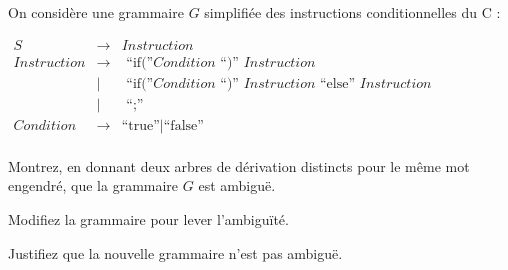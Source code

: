 
\begingroup

\begin{exercice}\label{exo:parsing/grammars/challenge}

  On considère une grammaire $G$ simplifiée des instructions conditionnelles du C :

  $\begin{array}{rrl}
    \mathit{S} &\rightarrow& \mathit{Instruction} \\
    \mathit{Instruction} & \rightarrow & \text{ ``if(''} \mathit{Condition} \text{ ``)'' } \mathit{Instruction}\\
    &\mid& \text{ ``if(''} \mathit{Condition} \text{ ``)'' } \mathit{Instruction} \text{ ``else'' } \mathit{Instruction} \\
    &\mid& \text{ ``;''} \\
    \mathit{Condition} &\rightarrow& \text{``true''} \mid \text{``false''} \\
  \end{array}$

  \begin{questions}
  \item Montrez, en donnant deux arbres de dérivation distincts pour le même mot engendré, que la grammaire $G$ est ambiguë. 
  \item Modifiez la grammaire pour lever l’ambiguïté. 
  \item Justifiez que la nouvelle grammaire n’est pas ambiguë.
  \end{questions}

\end{exercice}

